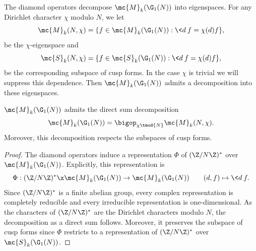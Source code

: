 \documentclass[12pt]{article}
\begin{document}
      The diamond operators decompose \(\mc{M}_{k}(\G_{1}(N))\) into eigenspaces. For any Dirichlet character \(\chi\) modulo \(N\), we let
      \[
        \mc{M}_{k}(N,\chi) = \{f \in \mc{M}_{k}(\G_{1}(N)):\<d\>f = \chi(d)f\},
      \]
      be the \(\chi\)-eigenspace and
      \[
        \mc{S}_{k}(N,\chi) = \{f \in \mc{S}_{k}(\G_{1}(N)):\<d\>f = \chi(d)f\},
      \]
      be the corresponding subspace of cusp forms. In the case \(\chi\) is trivial we will suppress this dependence. Then \(\mc{M}_{k}(\G_{1}(N))\) admits a decomposition into these eigenspaces.

      \begin{proposition}\label{thm:diamond_operator_decomposition_modular}
        \(\mc{M}_{k}(\G_{1}(N))\) admits the direct sum decomposition
        \[
          \mc{M}_{k}(\G_{1}(N)) = \bigop_{\chi \tmod{N}}\mc{M}_{k}(N,\chi).
        \]
        Moreover, this decomposition respects the subspaces of cusp forms.
      \end{proposition}
      \begin{proof}
        The diamond operators induce a representation \(\Phi\) of \((\Z/N\Z)^{\ast}\) over \(\mc{M}_{k}(\G_{1}(N))\). Explicitly, this representation is
        \[
          \Phi:(\Z/N\Z)^{\ast} \x \mc{M}_{k}(\G_{1}(N)) \to \mc{M}_{k}(\G_{1}(N)) \qquad (d,f) \mapsto \<d\>f.
        \]
        Since \((\Z/N\Z)^{\ast}\) is a finite abelian group, every complex representation is completely reducible and every irreducible representation is one-dimensional. As the characters of \((\Z/N\Z)^{\ast}\) are the Dirichlet characters modulo \(N\), the decomposition as a direct sum follows. Moreover, it preserves the subspace of cusp forms since \(\Phi\) restricts to a representation of \((\Z/N\Z)^{\ast}\) over \(\mc{S}_{k}(\G_{1}(N))\).
      \end{proof}
      
\end{document}
